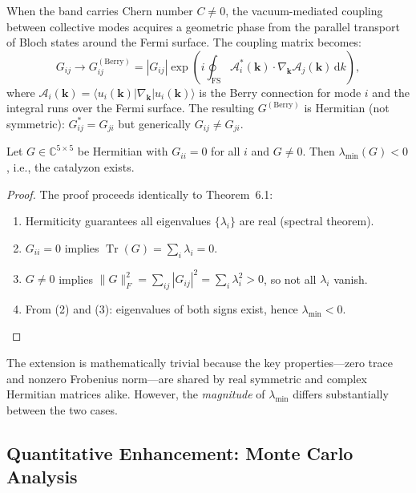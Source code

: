\documentclass[11pt,letterpaper]{article}
\begin{document}
When the band carries Chern number $C \neq 0$, the vacuum-mediated coupling between collective modes acquires a geometric phase from the parallel transport of Bloch states around the Fermi surface. The coupling matrix becomes:
\begin{equation}
G_{ij} \to G_{ij}^{(\text{Berry})} = |G_{ij}| \exp\left(i \oint_{\text{FS}} \mathcal{A}_i^*(\mathbf{k}) \cdot \nabla_{\mathbf{k}} \mathcal{A}_j(\mathbf{k}) \, \mathrm{d}k \right),
\end{equation}
where $\mathcal{A}_i(\mathbf{k}) = \langle u_i(\mathbf{k}) | \nabla_{\mathbf{k}} | u_i(\mathbf{k}) \rangle$ is the Berry connection for mode $i$ and the integral runs over the Fermi surface. The resulting $G^{(\text{Berry})}$ is Hermitian (not symmetric): $G_{ij}^* = G_{ji}$ but generically $G_{ij} \neq G_{ji}$.

\begin{theorem}
\label{thm:complex_hermitian}
Let $G \in \mathbb{C}^{5 \times 5}$ be Hermitian with $G_{ii} = 0$ for all $i$ and $G \neq 0$. Then $\lambda_{\min}(G) < 0$, i.e., the catalyzon exists.
\end{theorem}

\begin{proof}
The proof proceeds identically to Theorem~6.1:
\begin{enumerate}
\item Hermiticity guarantees all eigenvalues $\{\lambda_i\}$ are real (spectral theorem).
\item $G_{ii} = 0$ implies $\operatorname{Tr}(G) = \sum_i \lambda_i = 0$.
\item $G \neq 0$ implies $\|G\|_F^2 = \sum_{ij} |G_{ij}|^2 = \sum_i \lambda_i^2 > 0$, so not all $\lambda_i$ vanish.
\item From (2) and (3): eigenvalues of both signs exist, hence $\lambda_{\min} < 0$.
\end{enumerate}
\end{proof}

The extension is mathematically trivial because the key properties---zero trace and nonzero Frobenius norm---are shared by real symmetric and complex Hermitian matrices alike. However, the \textit{magnitude} of $\lambda_{\min}$ differs substantially between the two cases.

\subsection{Quantitative Enhancement: Monte Carlo Analysis}
\end{document}
